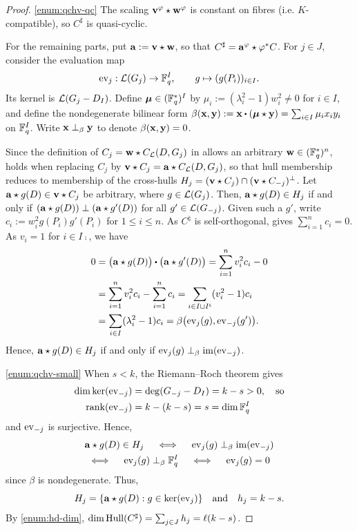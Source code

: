 \documentclass[twocolumn, 11pt]{scrartcl}
\begin{document}
\begin{proof}
    \ref{enum:qchv-qc} The scaling $\mathbf{v}^\varphi\star\mathbf{w}^\varphi$ is constant on fibres (i.e. $K$-compatible), so $C^\sharp$ is quasi-cyclic.

    For the remaining parts, put $\mathbf{a}:=\mathbf{v}\star\mathbf{w}$, so that $C^\sharp=\mathbf{a}^\varphi\star\varphi^*C$. For $j\in J$, consider the evaluation map
    \[ \operatorname{ev}_j:\mathcal{L}(G_j)\to\mathbb{F}_q^I,\qquad g\mapsto(g(P_i))_{i\in I}. \]
    Its kernel is $\mathcal{L}(G_j-D_I)$. Define $\boldsymbol\mu\in(\mathbb{F}_q^*)^I$ by $\mu_i:=(\lambda_i^2-1)w_i^2\neq0$ for $i\in I$, and define the nondegenerate bilinear form $\beta(\bfx,\bfy):=\bfx\dotpr(\bm\mu\star\bfy)=\sum_{i\in I}\mu_ix_iy_i$ on $\mathbb{F}_q^I$. Write $\mathbf{x}\perp_\beta\mathbf{y}$ to denote $\beta(\mathbf{x},\mathbf{y})=0$.

    Since the definition of $C_j=\mathbf{w}\star C_\mathcal{L}(D,G_j)$ in  allows an arbitrary $\mathbf{w}\in(\mathbb{F}_q^*)^n$,  holds when replacing $C_j$ by $\mathbf{v}\star C_j=\mathbf{a}\star C_\mathcal{L}(D,G_j)$, so that hull membership reduces to membership of the cross-hulls $H_j=(\mathbf{v}\star C_j)\cap(\mathbf{v}\star C_{-j})^\perp$. Let $\mathbf{a}\star g(D)\in\mathbf{v}\star C_j$ be arbitrary, where $g\in\mathcal{L}(G_j)$. Then, $\mathbf{a}\star g(D)\in H_j$ if and only if $(\mathbf{a}\star g(D))\perp(\mathbf{a}\star g'(D))$ for all $g'\in\mathcal{L}(G_{-j})$. Given such a $g'$, write $c_i:=w_i^2 g(P_i)g'(P_i)$ for $1\leq i\leq n$. As $C^\natural$ is self-orthogonal,  gives $\sum_{i=1}^n c_i=0$. As $v_i=1$ for $i\in I\comp$, we have
    \begin{align*}
        0&=\pa[\big]{\bfa\star g(D)}\dotpr\pa[\big]{\bfa\star g'(D)}=\sum_{i=1}^n v_i^2 c_i-0 \\
        &=\sum_{i=1}^n v_i^2 c_i-\sum_{i=1}^n c_i=\sum_{i\in I\sqcup I\comp} (v_i^2-1) c_i \\
        &=\sum_{i\in I} (\lambda_i^2-1) c_i= \beta\pa[\big]{\ev_j(g),\ev_{-j}(g')}.
    \end{align*}
    Hence, $\mathbf{a}\star g(D)\in H_j$ if and only if $\operatorname{ev}_j(g)\perp_\beta\operatorname{im}(\operatorname{ev}_{-j})$.

    \ref{enum:qchv-small} When $s<k$, the Riemann--Roch theorem gives
    \begin{align*}
        \dim\ker(\operatorname{ev}_{-j})&=\deg(G_{-j}-D_I)=k-s>0,\quad\text{so} \\
        \operatorname{rank}(\operatorname{ev}_{-j})&=k-(k-s)=s=\dim\mathbb{F}_q^I
    \end{align*}
    and $\operatorname{ev}_{-j}$ is surjective. Hence,
    \begin{gather*}
        \mathbf{a}\star g(D)\in H_j \quad\iff\quad \operatorname{ev}_j(g) \perp_\beta \operatorname{im}(\operatorname{ev}_{-j}) \\
        \iff\quad \operatorname{ev}_j(g) \perp_\beta \mathbb{F}_q^I 
        \quad\iff\quad \operatorname{ev}_j(g)=0
    \end{gather*}
    since $\beta$ is nondegenerate. Thus,
    \[ H_j=\{\mathbf{a}\star g(D):g\in\ker(\operatorname{ev}_j)\}\quad\text{and}\quad h_j=k-s.\]
    By \ref{enum:hd-dim}, $\dim\operatorname{Hull}(C^\sharp)=\sum_{j\in J}h_j=\ell(k-s)$.


\end{proof}
\end{document}
